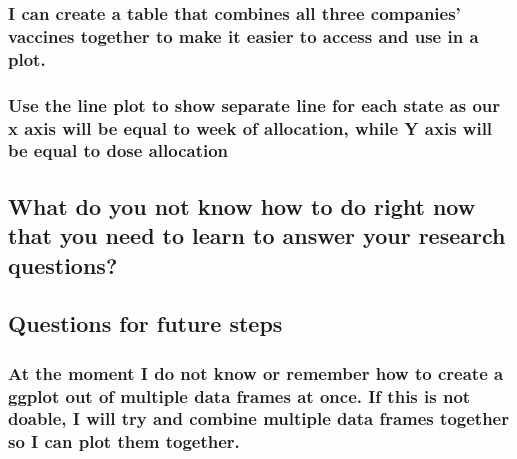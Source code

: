 \documentclass[
]{article}
\begin{document}
\hypertarget{i-can-create-a-table-that-combines-all-three-companies-vaccines-together-to-make-it-easier-to-access-and-use-in-a-plot.}{%
\subsubsection{I can create a table that combines all three companies'
vaccines together to make it easier to access and use in a
plot.}\label{i-can-create-a-table-that-combines-all-three-companies-vaccines-together-to-make-it-easier-to-access-and-use-in-a-plot.}}

\hypertarget{use-the-line-plot-to-show-separate-line-for-each-state-as-our-x-axis-will-be-equal-to-week-of-allocation-while-y-axis-will-be-equal-to-dose-allocation}{%
\subsubsection{Use the line plot to show separate line for each state as
our x axis will be equal to week of allocation, while Y axis will be
equal to dose
allocation}\label{use-the-line-plot-to-show-separate-line-for-each-state-as-our-x-axis-will-be-equal-to-week-of-allocation-while-y-axis-will-be-equal-to-dose-allocation}}

\hypertarget{what-do-you-not-know-how-to-do-right-now-that-you-need-to-learn-to-answer-your-research-questions}{%
\subsection{What do you not know how to do right now that you need to
learn to answer your research
questions?}\label{what-do-you-not-know-how-to-do-right-now-that-you-need-to-learn-to-answer-your-research-questions}}

\hypertarget{questions-for-future-steps}{%
\subsection{Questions for future
steps}\label{questions-for-future-steps}}

\hypertarget{at-the-moment-i-do-not-know-or-remember-how-to-create-a-ggplot-out-of-multiple-data-frames-at-once.-if-this-is-not-doable-i-will-try-and-combine-multiple-data-frames-together-so-i-can-plot-them-together.}{%
\subsubsection{At the moment I do not know or remember how to create a
ggplot out of multiple data frames at once. If this is not doable, I
will try and combine multiple data frames together so I can plot them
together.}\label{at-the-moment-i-do-not-know-or-remember-how-to-create-a-ggplot-out-of-multiple-data-frames-at-once.-if-this-is-not-doable-i-will-try-and-combine-multiple-data-frames-together-so-i-can-plot-them-together.}}
\end{document}
